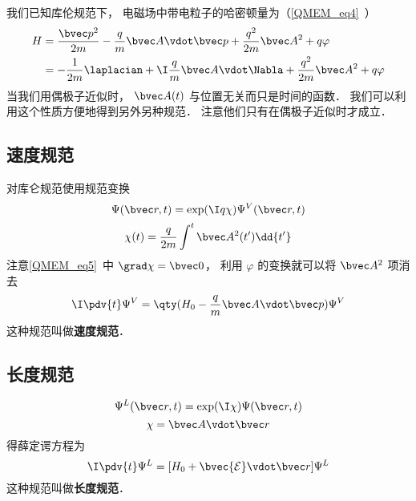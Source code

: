 
\begin{issues}
\issueDraft
\end{issues}


我们已知库伦规范下， 电磁场中带电粒子的哈密顿量为（\autoref{QMEM_eq4}~）
\begin{equation}
\begin{aligned}
H &= \frac{\bvec p^2}{2m} - \frac{q}{m} \bvec A \vdot \bvec p + \frac{q^2}{2m} \bvec A^2 + q\varphi\\
&= -\frac{1}{2m} \laplacian + \I \frac{q}{m} \bvec A \vdot \Nabla + \frac{q^2}{2m} \bvec A^2 + q\varphi
\end{aligned}
\end{equation}
当我们用偶极子近似时， $\bvec A(t)$ 与位置无关而只是时间的函数． 我们可以利用这个性质方便地得到另外另种规范． 注意他们只有在偶极子近似时才成立．

\subsection{速度规范}
对库仑规范使用规范变换
\begin{equation}\label{LVgaug_eq3}
\Psi(\bvec r, t) = \exp(\I q\chi)\Psi^V(\bvec r, t)
\end{equation}
\begin{equation}\label{LVgaug_eq4}
\chi(t) = \frac{q}{2m} \int^t \bvec A^2(t') \dd{t'}
\end{equation}
注意\autoref{QMEM_eq5}~中 $\grad \chi = \bvec 0$， 利用 $\varphi$ 的变换就可以将 $\bvec A^2$ 项消去
\begin{equation}
\I \pdv{t} \Psi^V = \qty(H_0 - \frac{q}{m} \bvec A \vdot \bvec p) \Psi^V
\end{equation}
这种规范叫做\textbf{速度规范}．

\subsection{长度规范}

\begin{equation}
\Psi^L(\bvec r, t) =  \exp(\I \chi) \Psi(\bvec r, t)
\end{equation}
\begin{equation}
\chi = \bvec A \vdot \bvec r
\end{equation}
得薛定谔方程为
\begin{equation}
\I \pdv{t} \Psi^L = [H_0 + \bvec{\mathcal{E}} \vdot \bvec r] \Psi^L
\end{equation}
这种规范叫做\textbf{长度规范}．
